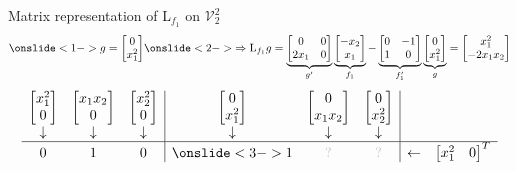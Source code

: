 \documentclass[10pt,T]{beamer}
\newcommand{\transparent}[1]{\textcolor{lightgray}{#1}}
\begin{document}
\begin{frame}[b]{Matrix representation of L$_{f_1}$ on $\mathcal{V}_2^2$}
\begin{equation*}
  \onslide<1->{g=\begin{bmatrix}0\\x_1^2\end{bmatrix}}
  \onslide<2->{\Rightarrow\text{L}_{f_1}g=\underbrace{\begin{bmatrix}0&0\\2x_1&0\end{bmatrix}}_{g'}\underbrace{\begin{bmatrix}-x_2\\x_1\end{bmatrix}}_{f_1}
    -\underbrace{\begin{bmatrix}0&-1\\1&0\end{bmatrix}}_{f_1'}\underbrace{\begin{bmatrix}0\\x_1^2\end{bmatrix}}_{g}=\begin{bmatrix}x_1^2\\-2x_1x_2\end{bmatrix}}
\end{equation*}
\begin{equation*}
  \begin{array}{ccc|ccc|cc}
    \begin{bmatrix}x_1^2\\0\end{bmatrix}&\begin{bmatrix}x_1x_2\\0\end{bmatrix}&\begin{bmatrix}x_2^2\\0\end{bmatrix}&\begin{bmatrix}0\\x_1^2\end{bmatrix}&\begin{bmatrix}0\\x_1x_2\end{bmatrix}&\begin{bmatrix}0\\x_2^2\end{bmatrix}&&\\
    \downarrow&\downarrow&\downarrow&\downarrow&\downarrow&\downarrow&&\\\hline
    0&1&0&\onslide<3->{1}&\transparent{?}&\transparent{?}&\leftarrow&\begin{bmatrix}x_1^2&0\end{bmatrix}^T\\

\end{array}
\end{equation*}
\end{frame}
\end{document}
